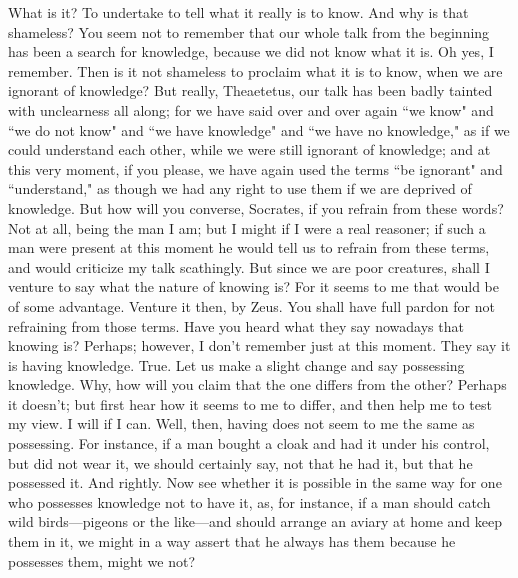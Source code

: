 \documentclass[letterpaper,12pt]{article}
\newcommand{\stephpag}[1]{\marginnote{\small\itshape\fontfamily{ppl}\selectfont #1}}
\begin{document}
\begin{drama}
What is it?
\socratesspeaks
To undertake to tell what it really is to know.
\theaetetusspeaks
And why is that shameless?
\socratesspeaks
You seem not to remember that our whole talk from the beginning has been a search for knowledge, because we did not know what it is.
\theaetetusspeaks
Oh yes, I remember.
\socratesspeaks
Then is it not shameless to proclaim what it is to know, when we are ignorant of knowledge? \stephpag{e} But really, Theaetetus, our talk has been badly tainted with unclearness all along; for we have said over and over again ``we know" and ``we do not know" and ``we have knowledge" and ``we have no knowledge," as if we could understand each other, while we were still ignorant of knowledge; and at this very moment, if you please, we have again used the terms ``be ignorant" and ``understand," as though we had any right to use them if we are deprived of knowledge.
\theaetetusspeaks
But how will you converse, Socrates, if you refrain from these words? \stephpag{197 a}
\socratesspeaks
Not at all, being the man I am; but I might if I were a real reasoner; if such a man were present at this moment he would tell us to refrain from these terms, and would criticize my talk scathingly. But since we are poor creatures, shall I venture to say what the nature of knowing is? For it seems to me that would be of some advantage.
\theaetetusspeaks
Venture it then, by Zeus. You shall have full pardon for not refraining from those terms.
\socratesspeaks
Have you heard what they say nowadays that knowing is?
\theaetetusspeaks
Perhaps; however, I don't remember just at this moment. \stephpag{b}
\socratesspeaks
They say it is having knowledge.
\theaetetusspeaks
True.
\socratesspeaks
Let us make a slight change and say possessing knowledge.
\theaetetusspeaks
Why, how will you claim that the one differs from the other?
\socratesspeaks
Perhaps it doesn't; but first hear how it seems to me to differ, and then help me to test my view.
\theaetetusspeaks
I will if I can.
\socratesspeaks
Well, then, having does not seem to me the same as possessing. For instance, if a man bought a cloak and had it under his control, but did not wear it, we should certainly say, not that he had it, but that he possessed it.
\theaetetusspeaks
And rightly. \stephpag{c}
\socratesspeaks
Now see whether it is possible in the same way for one who possesses knowledge not to have it, as, for instance, if a man should catch wild birds—pigeons or the like—and should arrange an aviary at home and keep them in it, we might in a way assert that he always has them because he possesses them, might we not?

\end{drama}
\end{document}
